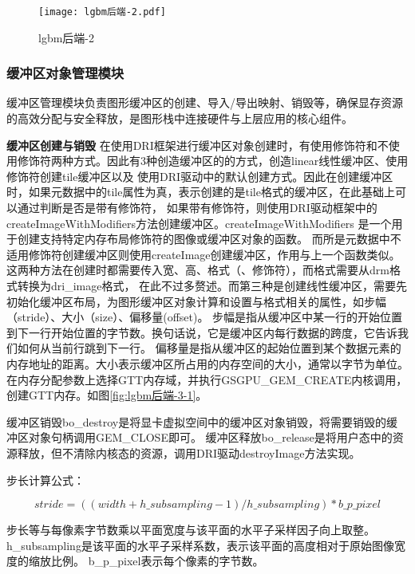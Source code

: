 \begin{figure}[H]
  \centering
  \texttt{[image: lgbm后端-2.pdf]}
  \caption{lgbm后端-2}
  \label{fig:lgbm后端-2}
\end{figure}  

\subsubsection{缓冲区对象管理模块}

缓冲区管理模块负责图形缓冲区的创建、导入/导出映射、销毁等，确保显存资源的高效分配与安全释放，是图形栈中连接硬件与上层应用的核心组件。

\textbf{缓冲区创建与销毁}
在使用DRI框架进行缓冲区对象创建时，有使用修饰符和不使用修饰符两种方式。因此有3种创造缓冲区的的方式，创造linear线性缓冲区、使用修饰符创建tile缓冲区以及
使用DRI驱动中的默认创建方式。因此在创建缓冲区时，如果元数据中的tile属性为真，表示创建的是tile格式的缓冲区，在此基础上可以通过判断是否是带有修饰符，
如果带有修饰符，则使用DRI驱动框架中的createImageWithModifiers方法创建缓冲区。createImageWithModifiers 是一个用于创建支持特定内存布局修饰符的图像或缓冲区对象的函数。
而所是元数据中不适用修饰符创建缓冲区则使用createImage创建缓冲区，作用与上一个函数类似。这两种方法在创建时都需要传入宽、高、格式（、修饰符），而格式需要从drm格式转换为dri\_image格式，
在此不过多赘述。而第三种是创建线性缓冲区，需要先初始化缓冲区布局，为图形缓冲区对象计算和设置与格式相关的属性，如步幅（stride）、大小（size）、偏移量(offset)。
步幅是指从缓冲区中某一行的开始位置到下一行开始位置的字节数。换句话说，它是缓冲区内每行数据的跨度，它告诉我们如何从当前行跳到下一行。
偏移量是指从缓冲区的起始位置到某个数据元素的内存地址的距离。大小表示缓冲区所占用的内存空间的大小，通常以字节为单位。
在内存分配参数上选择GTT内存域，并执行GSGPU\_GEM\_CREATE内核调用，创建GTT内存。如图\ref{fig:lgbm后端-3-1}。

缓冲区销毁bo\_destroy是将显卡虚拟空间中的缓冲区对象销毁，将需要销毁的缓冲区对象句柄调用GEM\_CLOSE即可。
缓冲区释放bo\_release是将用户态中的资源释放，但不清除内核态的资源，调用DRI驱动destroyImage方法实现。

步长计算公式：

\begin{equation}
  stride=((width+h\_subsampling-1)/h\_subsampling)*b\_p\_pixel
\end{equation}

步长等与每像素字节数乘以平面宽度与该平面的水平子采样因子向上取整。h\_subsampling是该平面的水平子采样系数，表示该平面的高度相对于原始图像宽度的缩放比例。
b\_p\_pixel表示每个像素的字节数。

